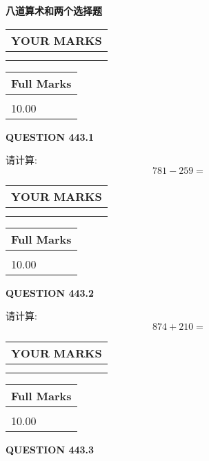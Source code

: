 \documentclass{ctexart}
\begin{document}
   
 \vspace{0.2in}
{\LARGE {\textbf{ 八道算术和两个选择题}}}
   
   
  
\vspace{0.2in}
  
\noindent\begin{tabular}{|l|}
\hline
 YOUR MARKS  \\
\hline
 \\ 
 \\ 
\hline
\end{tabular}
\hspace{0.05in} \begin{tabular}{|l|}
\hline
 Full Marks  \\
\hline
 \\ 
10.00 \\
\hline
\end{tabular}
{\textbf{\Large{QUESTION
443.1 
}}}
  
  
 
请计算:
\begin{equation}
781 -   %
259 = \nonumber
\end{equation}
 

 

 
  
\vspace{0.2in}
  
\noindent\begin{tabular}{|l|}
\hline
 YOUR MARKS  \\
\hline
 \\ 
 \\ 
\hline
\end{tabular}
\hspace{0.05in} \begin{tabular}{|l|}
\hline
 Full Marks  \\
\hline
 \\ 
10.00 \\
\hline
\end{tabular}
{\textbf{\Large{QUESTION
443.2 
}}}
  
  
 
请计算:
\begin{equation}
874 +  %
210 = \nonumber
\end{equation}
 

 

 
  
\vspace{0.2in}
  
\noindent\begin{tabular}{|l|}
\hline
 YOUR MARKS  \\
\hline
 \\ 
 \\ 
\hline
\end{tabular}
\hspace{0.05in} \begin{tabular}{|l|}
\hline
 Full Marks  \\
\hline
 \\ 
10.00 \\
\hline
\end{tabular}
{\textbf{\Large{QUESTION
443.3 
}}}
  
\end{document}
